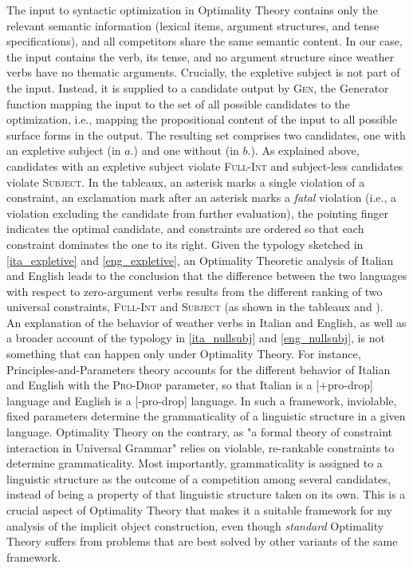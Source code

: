 The input to syntactic optimization in Optimality Theory contains only the relevant semantic information (lexical items, argument structures, and tense specifications), and all competitors share the same semantic content. In our case, the input contains the verb, its tense, and no argument structure since weather verbs have no thematic arguments. Crucially, the expletive subject is not part of the input. Instead, it is supplied to a candidate output by \textsc{Gen}, the Generator function mapping the input to the set of all possible candidates to the optimization, i.e., mapping the propositional content of the input to all possible surface forms in the output. The resulting set comprises two candidates, one with an expletive subject (in $a.$) and one without (in $b.$). As explained above, candidates with an expletive subject violate \textsc{Full-Int} and subject-less candidates violate \textsc{Subject}. In the tableaux, an asterisk marks a single violation of a constraint, an exclamation mark after an asterisk marks a \textit{fatal} violation (i.e., a violation excluding the candidate from further evaluation), the pointing finger indicates the optimal candidate, and constraints are ordered so that each constraint dominates the one to its right. Given the typology sketched in \ref{ita_expletive} and \ref{eng_expletive}, an Optimality Theoretic analysis of Italian and English leads to the conclusion that the difference between the two languages with respect to zero-argument verbs results from the different ranking of two universal constraints, \textsc{Full-Int} and \textsc{Subject} (as shown in the tableaux   and ).\\
An explanation of the behavior of weather verbs in Italian and English, as well as a broader account of the typology in \ref{ita_nullsubj} and \ref{eng_nullsubj}, is not something that can happen only under Optimality Theory. For instance, Principles-and-Parameters theory \parencite{chomsky1981pisa} accounts for the different behavior of Italian and English with the \textsc{Pro-Drop} parameter, so that Italian is a [+pro-drop] language and English is a [-pro-drop] language. In such a framework, inviolable, fixed parameters determine the grammaticality of a linguistic structure in a given language. Optimality Theory on the contrary, as "a formal theory of constraint interaction in Universal Grammar" \parencite{legendre2001introduction} relies on violable, re-rankable constraints to determine grammaticality. Most importantly, grammaticality is assigned to a linguistic structure as the outcome of a competition among several candidates, instead of being a property of that linguistic structure taken on its own. This is a crucial aspect of Optimality Theory that makes it a suitable framework for my analysis of the implicit object construction, even though \textit{standard} Optimality Theory suffers from problems that are best solved by other variants of the same framework. %
